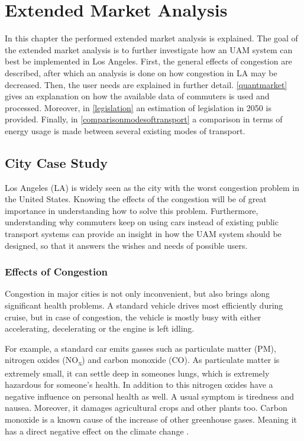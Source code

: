 \newpage

\chapter{Extended Market Analysis}
\label{ch-market}

In this chapter the performed extended market analysis is explained. The goal of the extended market analysis is to further investigate how an UAM system can best be implemented in Los Angeles. First, the general effects of congestion are described, after which an analysis is done on how congestion in LA may be decreased. Then, the user needs are explained in further detail. \autoref{quantmarket} gives an explanation on how the available data of commuters is used and processed. Moreover, in \autoref{legislation} an estimation of legislation in 2050 is provided. Finally, in \autoref{comparisonmodesoftransport} a comparison in terms of energy usage is made between several existing modes of transport. 

\section{City Case Study}

Los Angeles (LA) is widely seen as the city with the worst congestion problem in the United States. Knowing the effects of the congestion will be of great importance in understanding how to solve this problem. Furthermore, understanding why commuters keep on using cars instead of existing public transport systems can provide an insight in how the UAM system should be designed, so that it answers the wishes and needs of possible users.

\subsection{Effects of Congestion}

Congestion in major cities is not only inconvenient, but also brings along significant health problems. A standard vehicle drives most efficiently during cruise, but in case of congestion, the vehicle is mostly busy with either accelerating, decelerating or the engine is left idling. 

For example, a standard car emits gasses such as particulate matter (PM), nitrogen oxides (NO\textsubscript{x}) and carbon monoxide (CO). As particulate matter is extremely small, it can settle deep in someones lungs, which is extremely hazardous for someone's health. In addition to this nitrogen oxides have a negative influence on personal health as well. A usual symptom is tiredness and nausea. Moreover, it damages agricultural crops and other plants too. Carbon monoxide is a known cause of the increase of other greenhouse gases. Meaning it has a direct negative effect on the climate change \cite{cargasses}. 

